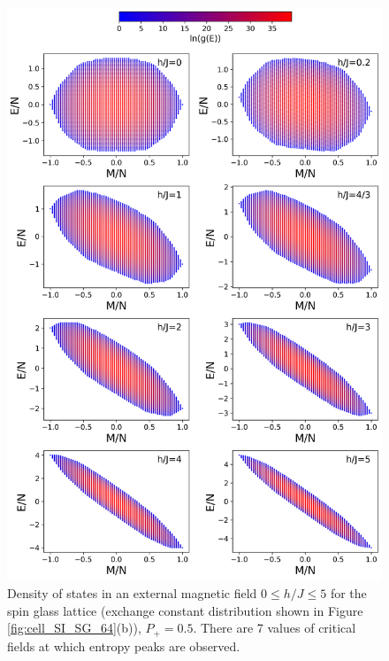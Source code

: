 \documentclass[preprint,12pt]{elsarticle}
\begin{document}
	\begin{figure}[H]
		\centering
		\includegraphics[width=1\linewidth]{pictures/HDOS_SG_64_J0.png}
		\caption{Density of states in an external magnetic field $0\leq h/J \leq 5$ for the spin glass lattice (exchange constant distribution shown in Figure \ref{fig:cell_SI_SG_64}(b)), $P_+ = 0.5$. There are 7 values of critical fields at which entropy peaks are observed.}
		\label{fig:HDOS_glass}
	\end{figure}
	
\end{document}
